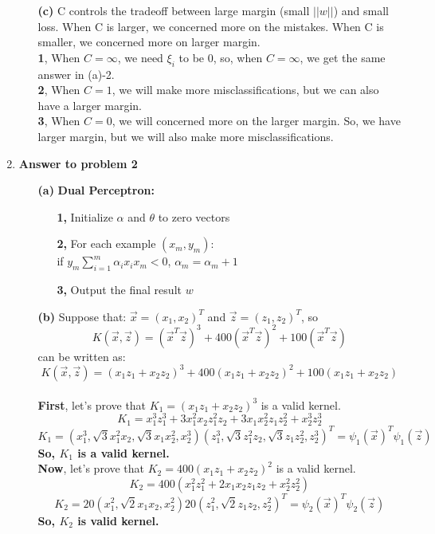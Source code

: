 \begin{enumerate}
\begin{enumerate}
\item[{\bf (c)}]
C controls the tradeoff between large margin (small $||w||$) and small loss. When C is larger, we concerned more on the mistakes. When C is smaller, we concerned more on larger margin.\\

{\bf 1}, When $C = \infty$, we need $\xi_i$ to be 0, so, when $C = \infty$, we get the same answer in (a)-2.\\
{\bf 2}, When $C = 1$, we will make more misclassifications, but we can also have a larger margin.\\
{\bf 3}, When $C = 0$, we will concerned more on the larger margin. So, we have larger margin, but we will also make more misclassifications.\\

\end{enumerate}

\item {\bf Answer to problem 2}

\begin{enumerate}
\item[{\bf (a)}]
{\bf Dual Perceptron:}
\begin{enumerate}
\item[{\bf 1, }] Initialize $\alpha$ and $\theta$ to zero vectors
\item[{\bf 2, }] For each example $(x_m, y_m)$:\\
\qquad if $y_m \sum_{i = 1}^m\alpha_ix_ix_m < 0$, $\alpha_m = \alpha_m+1$
\item[{\bf 3, }] Output the final result $w$\\
\end{enumerate}

\item[{\bf (b)}]
Suppose that: $\vec{x} = (x_1, x_2)^T$ and $\vec{z} = (z_1, z_2)^T$, so $$K(\vec{x}, \vec{z}) = (\vec{x}^T\vec{z})^3 + 400(\vec{x}^T\vec{z})^2 + 100(\vec{x}^T\vec{z})$$ can be written as:
$$K(\vec{x}, \vec{z}) = (x_1z_1 + x_2z_2)^3 + 400(x_1z_1 + x_2z_2)^2 + 100(x_1z_1 + x_2z_2)$$\\
{\bf First}, let's prove that $K_1 = (x_1z_1 + x_2z_2)^3$ is a valid kernel.
$$K_1 = x_1^3z_1^3 + 3x_1^2x_2z_1^2z_2 + 3x_1x_2^2z_1z_2^2 + x_2^3z_2^3$$
$$K_1 = (x_1^3, \sqrt{3}x_1^2x_2, \sqrt{3}x_1x_2^2, x_2^3)(z_1^3, \sqrt{3}z_1^2z_2, \sqrt{3}z_1z_2^2, z_2^3)^T = \psi_1(\vec{x})^T\psi_1(\vec{z})$$
{\bf So, $K_1$ is a valid kernel.}\\

{\bf Now}, let's prove that $K_2 = 400(x_1z_1 + x_2z_2)^2$ is a valid kernel.
$$K_2 = 400(x_1^2z_1^2 + 2x_1x_2z_1z_2 + x_2^2z_2^2)$$
$$K_2 = 20(x_1^2, \sqrt{2}x_1x_2, x_2^2) 20(z_1^2, \sqrt{2}z_1z_2, z_2^2)^T = \psi_2(\vec{x})^T\psi_2(\vec{z})$$
{\bf So, $K_2$ is valid kernel.}\\


\end{enumerate}
\end{enumerate}
